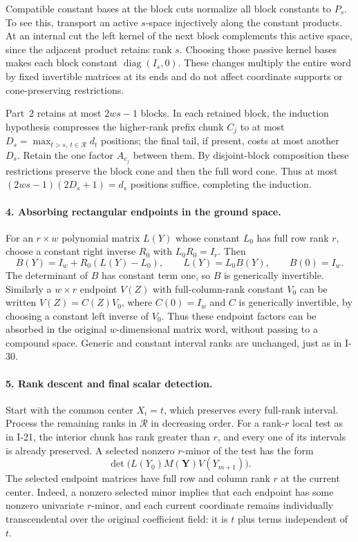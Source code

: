 \documentclass[11pt,a4paper]{article}
\theoremstyle{definition}\newtheorem{definition}{Definition}
\begin{document}
Compatible constant bases at the block cuts normalize all
block constants to $P_s$.  To see this, transport an active
$s$-space injectively along the constant products.  At an
internal cut the left kernel of the next block complements
this active space, since the adjacent product retains rank
$s$.  Choosing those passive kernel bases makes each block
constant $\operatorname{diag}(I_s,0)$.
These changes multiply the entire word by fixed invertible
matrices at its ends and do not affect coordinate supports
or cone-preserving restrictions.

Part~2 retains at most $2ws-1$ blocks.  In each retained
block, the induction hypothesis compresses the higher-rank
prefix chunk $C_j$ to at most
$D_s=\max_{t>s,\ t\in\mathcal R}d_t$ positions; the final
tail, if present, costs at most another $D_s$.  Retain the
one factor $A_{e_j}$ between them.  By disjoint-block
composition these restrictions preserve the block cone and
then the full word cone.  Thus at most
$(2ws-1)(2D_s+1)=d_s$ positions suffice, completing the
induction.

\paragraph{4. Absorbing rectangular endpoints in the ground space.}
For an $r\times w$ polynomial matrix $L(Y)$ whose constant
$L_0$ has full row rank $r$, choose a constant right inverse
$R_0$ with $L_0R_0=I_r$.  Then
\[
 B(Y)=I_w+R_0(L(Y)-L_0),\qquad
 L(Y)=L_0B(Y),\qquad B(0)=I_w.
 \tag{I.53}
\]
The determinant of $B$ has constant term one, so $B$ is
generically invertible.  Similarly a $w\times r$ endpoint
$V(Z)$ with full-column-rank constant $V_0$ can be written
$V(Z)=C(Z)V_0$, where $C(0)=I_w$ and $C$ is generically
invertible, by choosing a constant left inverse of $V_0$.
Thus these endpoint factors can be absorbed in the original
$w$-dimensional matrix word, without passing to a compound
space.  Generic and constant interval ranks are unchanged,
just as in I-30.

\paragraph{5. Rank descent and final scalar detection.}
Start with the common center $X_i=t$, which preserves every
full-rank interval.  Process the remaining ranks in
$\mathcal R$ in decreasing order.  For a rank-$r$ local test
as in I-21, the interior chunk has rank greater than $r$,
and every one of its intervals is already preserved.
A selected nonzero $r$-minor of the test has the form
\[
 \det\bigl(L(Y_0)M(\mathbf Y)V(Y_{m+1})\bigr).
\]
The selected endpoint matrices have full row and column
rank $r$ at the current center.  Indeed, a nonzero selected
minor implies that each endpoint has some nonzero
univariate $r$-minor, and each current coordinate remains
individually transcendental over the original coefficient
field: it is $t$ plus terms independent of $t$.
\end{document}
